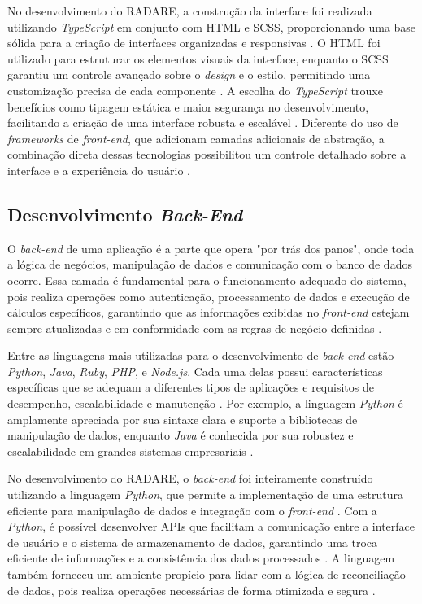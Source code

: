 No desenvolvimento do RADARE, a construção da interface foi realizada utilizando \textit{TypeScript} em conjunto com HTML e SCSS, proporcionando uma base sólida para a criação de interfaces organizadas e responsivas \cite{typescriptbook}. O HTML foi utilizado para estruturar os elementos visuais da interface, enquanto o SCSS garantiu um controle avançado sobre o \textit{design} e o estilo, permitindo uma customização precisa de cada componente \cite{htmlcssbook}. A escolha do \textit{TypeScript} trouxe benefícios como tipagem estática e maior segurança no desenvolvimento, facilitando a criação de uma interface robusta e escalável \cite{typescriptsecurity}. Diferente do uso de \textit{frameworks} de \textit{front-end}, que adicionam camadas adicionais de abstração, a combinação direta dessas tecnologias possibilitou um controle detalhado sobre a interface e a experiência do usuário \cite{frontendwithoutframework}.

\subsection{Desenvolvimento \textit{Back-End}}

O \textit{back-end} de uma aplicação é a parte que opera "por trás dos panos", onde toda a lógica de negócios, manipulação de dados e comunicação com o banco de dados ocorre. Essa camada é fundamental para o funcionamento adequado do sistema, pois realiza operações como autenticação, processamento de dados e execução de cálculos específicos, garantindo que as informações exibidas no \textit{front-end} estejam sempre atualizadas e em conformidade com as regras de negócio definidas \cite{backendroles}.

Entre as linguagens mais utilizadas para o desenvolvimento de \textit{back-end} estão \textit{Python}, \textit{Java}, \textit{Ruby}, \textit{PHP}, e \textit{Node.js}. Cada uma delas possui características específicas que se adequam a diferentes tipos de aplicações e requisitos de desempenho, escalabilidade e manutenção \cite{backendlanguages}. Por exemplo, a linguagem \textit{Python} é amplamente apreciada por sua sintaxe clara e suporte a bibliotecas de manipulação de dados, enquanto \textit{Java} é conhecida por sua robustez e escalabilidade em grandes sistemas empresariais \cite{javabackend}.

No desenvolvimento do RADARE, o \textit{back-end} foi inteiramente construído utilizando a linguagem \textit{Python}, que permite a implementação de uma estrutura eficiente para manipulação de dados e integração com o \textit{front-end} \cite{pythonweb}. Com a \textit{Python}, é possível desenvolver APIs que facilitam a comunicação entre a interface de usuário e o sistema de armazenamento de dados, garantindo uma troca eficiente de informações e a consistência dos dados processados \cite{pythonapi}. A linguagem também forneceu um ambiente propício para lidar com a lógica de reconciliação de dados, pois realiza operações necessárias de forma otimizada e segura \cite{pythondata}.

